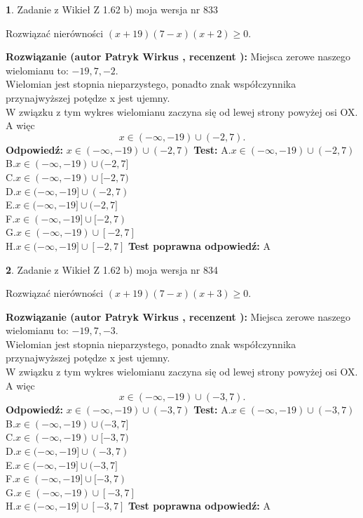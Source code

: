 \documentclass[12pt, a4paper]{article}
\theoremstyle{definition} %
\newtheorem{zad}{}
\newcommand{\zadStart}[1]{\begin{zad}#1\newline}
\newcommand{\zadStop}{\end{zad}}
\newcommand{\rozwStart}[2]{\noindent \textbf{Rozwiązanie (autor #1 , recenzent #2): }\newline}
\newcommand{\rozwStop}{\newline}
\newcommand{\odpStart}{\noindent \textbf{Odpowiedź:}\newline}
\newcommand{\odpStop}{\newline}
\newcommand{\testStart}{\noindent \textbf{Test:}\newline}
\newcommand{\testStop}{\newline}
\newcommand{\kluczStart}{\noindent \textbf{Test poprawna odpowiedź:}\newline}
\newcommand{\kluczStop}{\newline}
\begin{document}
\zadStart{Zadanie z Wikieł Z 1.62 b) moja wersja nr 833}

Rozwiązać nierówności $(x+19)(7-x)(x+2)\ge0$.
\zadStop
\rozwStart{Patryk Wirkus}{}
Miejsca zerowe naszego wielomianu to: $-19, 7, -2$.\\
Wielomian jest stopnia nieparzystego, ponadto znak współczynnika przy\linebreak najwyższej potędze x jest ujemny.\\ W związku z tym wykres wielomianu zaczyna się od lewej strony powyżej osi OX. A więc $$x \in (-\infty,-19) \cup (-2,7).$$
\rozwStop
\odpStart
$x \in (-\infty,-19) \cup (-2,7)$
\odpStop
\testStart
A.$x \in (-\infty,-19) \cup (-2,7)$\\
B.$x \in (-\infty,-19) \cup (-2,7]$\\
C.$x \in (-\infty,-19) \cup [-2,7)$\\
D.$x \in (-\infty,-19] \cup (-2,7)$\\
E.$x \in (-\infty,-19] \cup (-2,7]$\\
F.$x \in (-\infty,-19] \cup [-2,7)$\\
G.$x \in (-\infty,-19) \cup [-2,7]$\\
H.$x \in (-\infty,-19] \cup [-2,7]$
\testStop
\kluczStart
A
\kluczStop



\zadStart{Zadanie z Wikieł Z 1.62 b) moja wersja nr 834}

Rozwiązać nierówności $(x+19)(7-x)(x+3)\ge0$.
\zadStop
\rozwStart{Patryk Wirkus}{}
Miejsca zerowe naszego wielomianu to: $-19, 7, -3$.\\
Wielomian jest stopnia nieparzystego, ponadto znak współczynnika przy\linebreak najwyższej potędze x jest ujemny.\\ W związku z tym wykres wielomianu zaczyna się od lewej strony powyżej osi OX. A więc $$x \in (-\infty,-19) \cup (-3,7).$$
\rozwStop
\odpStart
$x \in (-\infty,-19) \cup (-3,7)$
\odpStop
\testStart
A.$x \in (-\infty,-19) \cup (-3,7)$\\
B.$x \in (-\infty,-19) \cup (-3,7]$\\
C.$x \in (-\infty,-19) \cup [-3,7)$\\
D.$x \in (-\infty,-19] \cup (-3,7)$\\
E.$x \in (-\infty,-19] \cup (-3,7]$\\
F.$x \in (-\infty,-19] \cup [-3,7)$\\
G.$x \in (-\infty,-19) \cup [-3,7]$\\
H.$x \in (-\infty,-19] \cup [-3,7]$
\testStop
\kluczStart
A
\kluczStop
\end{document}
